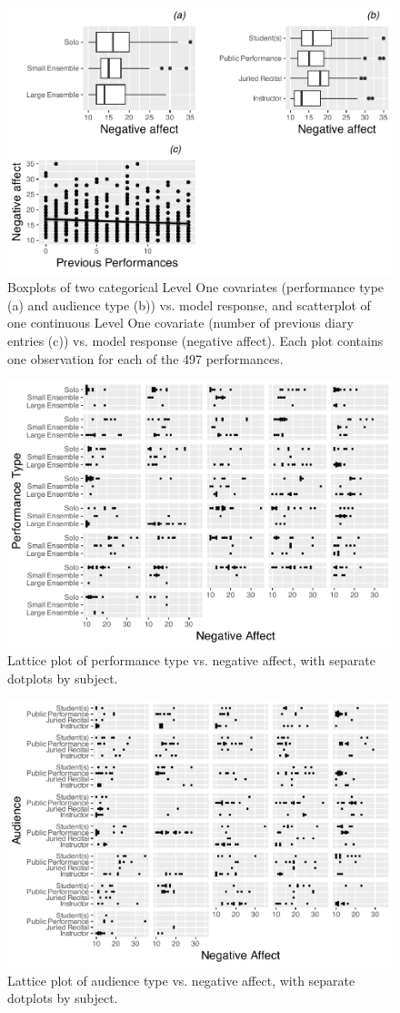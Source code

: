 \documentclass[
]{krantz}
\begin{document}
\begin{figure}

{\centering \includegraphics[width=0.6\linewidth]{bookdown-BeyondMLR_files/figure-latex/mli-boxscatmat1-1} 

}

\caption{Boxplots of two categorical Level One covariates (performance type (a) and audience type (b)) vs. model response, and scatterplot of one continuous Level One covariate (number of previous diary entries (c)) vs. model response (negative affect).  Each plot contains one observation for each of the 497 performances.}\label{fig:mli-boxscatmat1}
\end{figure}

\begin{figure}

{\centering \includegraphics[width=0.6\linewidth]{bookdown-BeyondMLR_files/figure-latex/mli-lattice1-1} 

}

\caption{Lattice plot of performance type vs. negative affect, with separate dotplots by subject.}\label{fig:mli-lattice1}
\end{figure}

\begin{figure}

{\centering \includegraphics[width=0.6\linewidth]{bookdown-BeyondMLR_files/figure-latex/mli-lattice2-1} 

}

\caption{Lattice plot of audience type vs. negative affect, with separate dotplots by subject.}\label{fig:mli-lattice2}
\end{figure}
\end{document}
